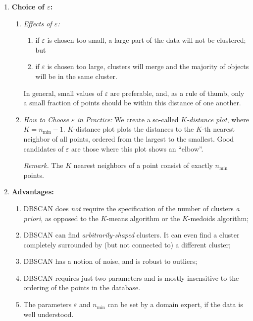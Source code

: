 \documentclass[12pt]{article}
\begin{document}
\begin{enumerate}[label=\textbf{\arabic*.}]
	\item \textbf{Choice of $\varepsilon$:}
	\begin{enumerate}
		\item \textit{Effects of $\varepsilon$:}
		\begin{enumerate}
			\item if $\varepsilon$ is chosen too small, a large part of the data will not be clustered; but 
			\item if $\varepsilon$ is chosen too large, clusters will merge and the majority of objects will be in the same cluster. 
		\end{enumerate}
		In general, small values of $\varepsilon$ are preferable, and, as a rule of thumb, only a small fraction of points should be within this distance of one another. 
		
		\item \textit{How to Choose $\varepsilon$ in Practice:} We create a so-called \emph{$K$-distance plot}, where $K = n_{\min} - 1$. $K$-distance plot plots the distances to the $K$-th nearest neighbor of all points, ordered from the largest to the smallest. Good candidates of $\varepsilon$ are those where this plot shows an ``elbow''. 
		
		\textit{Remark.} The $K$ nearest neighbors of a point consist of exactly $n_{\min}$ points. 
		
	\end{enumerate}
	
	\item \textbf{Advantages:}
	\begin{enumerate}
		\item DBSCAN does \emph{not} require the specification of the number of clusters \emph{a priori}, as opposed to the $K$-means algorithm or the $K$-medoids algorithm; 
		\item DBSCAN can find \emph{arbitrarily-shaped} clusters. It can even find a cluster completely surrounded by (but not connected to) a different cluster; 
		\item DBSCAN has a notion of noise, and is robust to outliers; 
		\item DBSCAN requires just two parameters and is mostly insensitive to the ordering of the points in the database. 
		\item The parameters $\varepsilon$ and $n_{\min}$ can be set by a domain expert, if the data is well understood. 
	\end{enumerate}
	

\end{enumerate}
\end{document}
